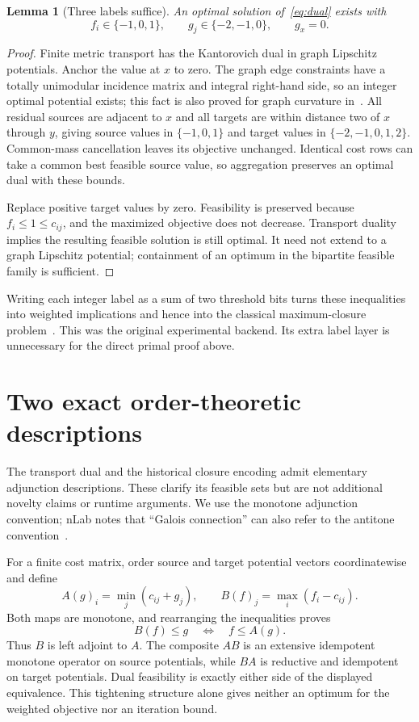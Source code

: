 \documentclass[11pt]{article}
\newtheorem{lemma}[theorem]{Lemma}
\theoremstyle{remark}
\begin{document}
\begin{lemma}[Three labels suffice]\label{lem:labels}
An optimal solution of~\eqref{eq:dual} exists with
\[
 f_i\in\{-1,0,1\},\qquad
 g_j\in\{-2,-1,0\},\qquad g_x=0.
\]
\end{lemma}
\begin{proof}
Finite metric transport has the Kantorovich dual in graph Lipschitz potentials. Anchor the value at $x$ to zero. The graph edge constraints have a totally unimodular incidence matrix and integral right-hand side, so an integer optimal potential exists; this fact is also proved for graph curvature in~\cite{kelly}. All residual sources are adjacent to $x$ and all targets are within distance two of $x$ through $y$, giving source values in $\{-1,0,1\}$ and target values in $\{-2,-1,0,1,2\}$. Common-mass cancellation leaves its objective unchanged. Identical cost rows can take a common best feasible source value, so aggregation preserves an optimal dual with these bounds.

Replace positive target values by zero. Feasibility is preserved because $f_i\le1\le c_{ij}$, and the maximized objective does not decrease. Transport duality implies the resulting feasible solution is still optimal. It need not extend to a graph Lipschitz potential; containment of an optimum in the bipartite feasible family is sufficient.
\end{proof}


Writing each integer label as a sum of two threshold bits turns these inequalities into weighted implications and hence into the classical maximum-closure problem~\cite{picard}. This was the original experimental backend. Its extra label layer is unnecessary for the direct primal proof above.

\section{Two exact order-theoretic descriptions}

The transport dual and the historical closure encoding admit elementary adjunction descriptions. These clarify its feasible sets but are not additional novelty claims or runtime arguments. We use the monotone adjunction convention; nLab notes that ``Galois connection'' can also refer to the antitone convention~\cite{nlabgalois,nlabclosure}.

For a finite cost matrix, order source and target potential vectors coordinatewise and define
\[
 A(g)_i=\min_j(c_{ij}+g_j),\qquad
 B(f)_j=\max_i(f_i-c_{ij}).
\]
Both maps are monotone, and rearranging the inequalities proves
\[
 B(f)\le g\quad\Longleftrightarrow\quad f\le A(g).
\]
Thus $B$ is left adjoint to $A$. The composite $AB$ is an extensive idempotent monotone operator on source potentials, while $BA$ is reductive and idempotent on target potentials. Dual feasibility is exactly either side of the displayed equivalence. This tightening structure alone gives neither an optimum for the weighted objective nor an iteration bound.
\end{document}
